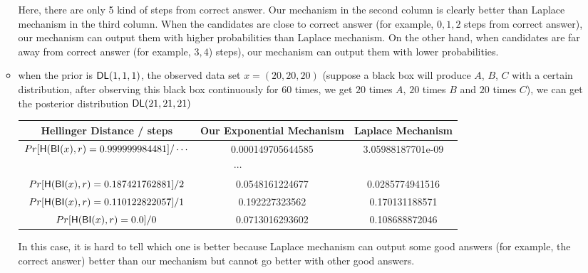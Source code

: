 \begin{itemize}
\begin{itemize}
		Here, there are only 5 kind of steps from correct answer. Our mechanism in the second column is clearly better than Laplace mechanism in the third column. When the candidates are close to correct answer (for example, $0, 1, 2$ steps from correct answer), our mechanism can output them with higher probabilities than Laplace mechanism. On the other hand, when candidates are far away from correct answer (for example, $3, 4$) steps), our mechanism can output them with lower probabilities.

		\item when the prior is $\mathsf{DL}(1,1,1)$, the observed data set $x = (20,20,20)$ (suppose a black box will produce $A$, $B$, $C$ with a certain distribution, after observing this black box continuously for 60 times, we get $20$ times $A$, $20$ times $B$ and $20$ times $C$), we can get the posterior distribution $\mathsf{DL}(21,21,21)$

		\begin{center}
		 \begin{tabular}{c | c | c} 
		 \hline
		 Hellinger Distance / steps & Our Exponential Mechanism & Laplace Mechanism  \\
		 \hline\hline
		 $Pr[\mathsf{H}(\mathsf{BI}(x), r) = 0.999999984481] / \cdots 	$ & 0.000149705644585 & 3.05988187701e-09\\ 
		 \hline
		 \multicolumn{3}{c}{$\cdots$}  \\
		 \hline
		 $Pr[\mathsf{H}(\mathsf{BI}(x), r) = 0.187421762881] / 2		$ & 0.0548161224677 & 0.0285774941516 \\
		 \hline
		 $Pr[\mathsf{H}(\mathsf{BI}(x), r) = 0.110122822057 ] / 1		$ & 0.192227323562 & 0.170131188571  \\
		 \hline
		 $Pr[\mathsf{H}(\mathsf{BI}(x), r) = 0.0 ] / 0 					$ & 0.0713016293602 & 0.108688872046 \\
		 \hline
		\end{tabular}
		\end{center}

		In this case, it is hard to tell which one is better because Laplace mechanism can output some good answers (for example, the correct answer) better than our mechanism but cannot go better with other good answers.


\end{itemize}
\end{itemize}
